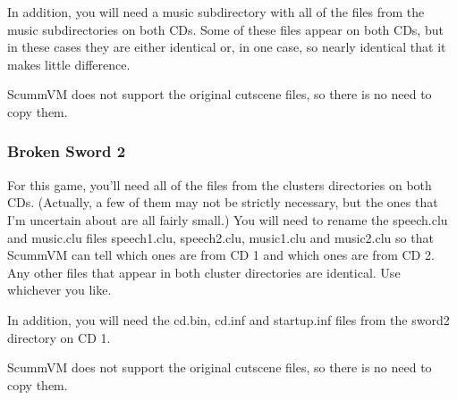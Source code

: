 In addition, you will need a music subdirectory with all of the files
from the music subdirectories on both CDs. Some of these files appear
on both CDs, but in these cases they are either identical or, in one
case, so nearly identical that it makes little difference.

ScummVM does not support the original cutscene files, so there is no
need to copy them.

\subsubsection{Broken Sword 2}

For this game, you'll need all of the files from the clusters
directories on both CDs. (Actually, a few of them may not be strictly
necessary, but the ones that I'm uncertain about are all fairly
small.) You will need to rename the speech.clu and music.clu files
speech1.clu, speech2.clu, music1.clu and music2.clu so that ScummVM
can tell which ones are from CD 1 and which ones are from CD 2. Any
other files that appear in both cluster directories are identical. Use
whichever you like.

In addition, you will need the cd.bin, cd.inf and startup.inf files
from the sword2 directory on CD 1.

ScummVM does not support the original cutscene files, so there is no
need to copy them.
